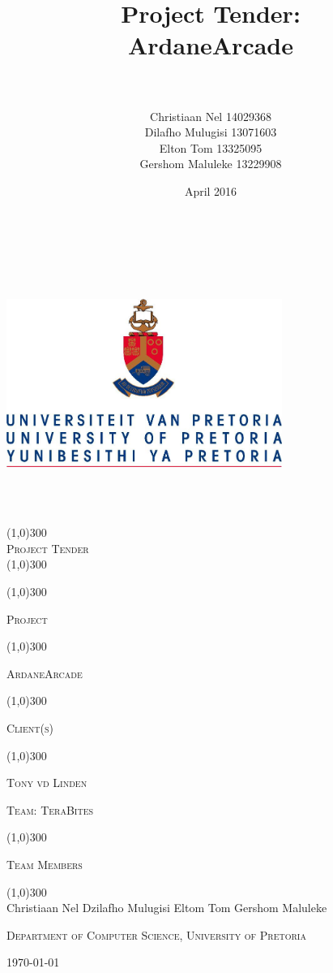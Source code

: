 \documentclass[12pt,a4paper]{report}
\title{Project Tender: \\ ArdaneArcade }
\author{\\\\Christiaan Nel 14029368\\ Dilafho Mulugisi 13071603 \\
	Elton Tom 13325095 \\ Gershom Maluleke 13229908
    }
\date{April 2016}
\begin{document}
\begin{titlepage}
	\begin{center}
		\vspace*{-3cm}\includegraphics[width=9cm,height=9cm,keepaspectratio]{UP.jpg}  \\
		[0.05cm]
		\line(1,0){300} \\
		[0.4cm]
		\textsc{\huge
			Project Tender
		} \\
		[0.1cm]
		\line(1,0){300} \\
		[0.05cm]

	\end{center}
	\centering
	\vspace{0.007cm}
	\line(1,0){300}
	\\[0.05cm]
    {\scshape\LARGE Project \par}
    \line(1,0){300}
	\\[0.2cm]
    {\scshape\large  ArdaneArcade \par}
	\vspace{0.1cm}
	\line(1,0){300}
	\\[0.05cm]
	{\scshape\LARGE Client(s) \par}
	\line(1,0){300}
	\\[0.2cm]
	\vspace{0.01cm}
	
	{\scshape\large Tony vd Linden\par}
	
	\vspace{0.5cm}
	{\scshape\LARGE Team: \large TeraBites\par}
	\line(1,0){300}
	\\[0.01cm]
	{\scshape\LARGE Team Members\par}
	\line(1,0){300}
	\\[0.01cm]
	\vspace{0.9cm}
	\vfill Christiaan Nel
	\vfill Dzilafho Mulugisi
	\vfill Eltom Tom
	\vfill Gershom Maluleke
	
	\vspace{0.9cm}
    {\scshape\large Department of Computer Science, University of Pretoria\par}


	

	{\large \today\par}
	\end{titlepage}
	
\end{document}
